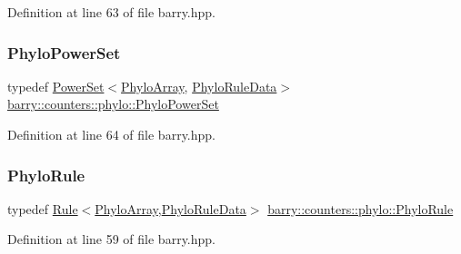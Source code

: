 Definition at line 63 of file barry.\+hpp.

\mbox{\label{namespacebarry_1_1counters_1_1phylo_ae89de0bf34247cac5b080aeb29b25239}} 
\subsubsection{\texorpdfstring{Phylo\+Power\+Set}{PhyloPowerSet}}
{\footnotesize\ttfamily typedef \hyperlink{classbarry_1_1_power_set}{Power\+Set}$<$\hyperlink{namespacebarry_1_1counters_1_1phylo_abd293bf65e494e903639fb5fb2c91604}{Phylo\+Array}, \hyperlink{namespacebarry_1_1counters_1_1phylo_a5da540950bcf3372bcedb17a5b23667c}{Phylo\+Rule\+Data}$>$ \hyperlink{namespacebarry_1_1counters_1_1phylo_ae89de0bf34247cac5b080aeb29b25239}{barry\+::counters\+::phylo\+::\+Phylo\+Power\+Set}}



Definition at line 64 of file barry.\+hpp.

\mbox{\label{namespacebarry_1_1counters_1_1phylo_a46a7015a86c3c1f9df301fb181ccd82c}} 
\subsubsection{\texorpdfstring{Phylo\+Rule}{PhyloRule}}
{\footnotesize\ttfamily typedef \hyperlink{classbarry_1_1_rule}{Rule}$<$\hyperlink{namespacebarry_1_1counters_1_1phylo_abd293bf65e494e903639fb5fb2c91604}{Phylo\+Array},\hyperlink{namespacebarry_1_1counters_1_1phylo_a5da540950bcf3372bcedb17a5b23667c}{Phylo\+Rule\+Data}$>$ \hyperlink{namespacebarry_1_1counters_1_1phylo_a46a7015a86c3c1f9df301fb181ccd82c}{barry\+::counters\+::phylo\+::\+Phylo\+Rule}}



Definition at line 59 of file barry.\+hpp.

\mbox{\label{namespacebarry_1_1counters_1_1phylo_a5da540950bcf3372bcedb17a5b23667c}} 
